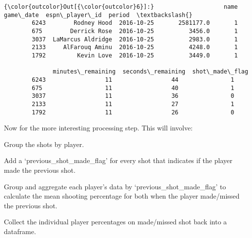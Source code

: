 \documentclass{article}
\begin{document}
            \begin{Verbatim}[commandchars=\\\{\}]
{\color{outcolor}Out[{\color{outcolor}6}]:}                    name   game\_date  espn\_player\_id  period  \textbackslash{}
        6243        Rodney Hood  2016-10-25       2581177.0       1   
        675        Derrick Rose  2016-10-25          3456.0       1   
        3037  LaMarcus Aldridge  2016-10-25          2983.0       1   
        2133     AlFarouq Aminu  2016-10-25          4248.0       1   
        1792         Kevin Love  2016-10-25          3449.0       1   
        
              minutes\_remaining  seconds\_remaining  shot\_made\_flag  
        6243                 11                 44               1  
        675                  11                 40               1  
        3037                 11                 36               0  
        2133                 11                 27               1  
        1792                 11                 26               0  
\end{Verbatim}
        
    Now for the more interesting processing step. This will involve:

Group the shots by player.

Add a `previous\_shot\_made\_flag' for every shot that indicates if the
player made the previous shot.

Group and aggregate each player's data by `previous\_shot\_made\_flag'
to calculate the mean shooting percentage for both when the player
made/missed the previous shot.

Collect the individual player percentages on made/missed shot back into
a dataframe.
\end{document}
